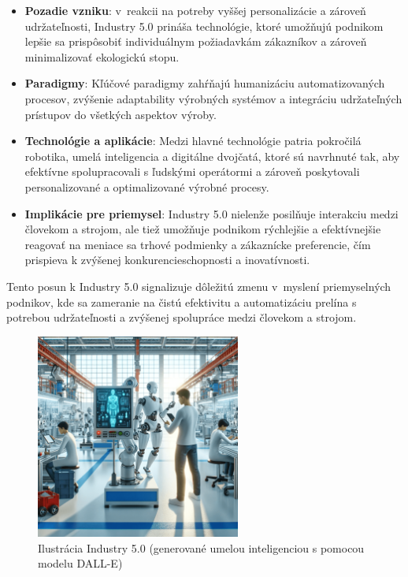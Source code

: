 \begin{itemize}
\item \textbf{Pozadie vzniku}: v~reakcii na potreby vyššej personalizácie a zároveň udržateľnosti, Industry 5.0 prináša technológie, ktoré umožňujú podnikom lepšie sa prispôsobiť individuálnym požiadavkám zákazníkov a zároveň minimalizovať ekologickú stopu.

\item \textbf{Paradigmy}: Kľúčové paradigmy zahŕňajú humanizáciu automatizovaných procesov, zvýšenie adaptability výrobných systémov a integráciu udržateľných prístupov do všetkých aspektov výroby.

\item \textbf{Technológie a aplikácie}: Medzi hlavné technológie patria pokročilá robotika, umelá inteligencia a digitálne dvojčatá, ktoré sú navrhnuté tak, aby efektívne spolupracovali s ľudskými operátormi a zároveň poskytovali personalizované a optimalizované výrobné procesy.

\item \textbf{Implikácie pre priemysel}: Industry 5.0 nielenže posilňuje interakciu medzi človekom a strojom, ale tiež umožňuje podnikom rýchlejšie a efektívnejšie reagovať na meniace sa trhové podmienky a zákaznícke preferencie, čím prispieva k zvýšenej konkurencieschopnosti a inovatívnosti.

\end{itemize}

Tento posun k Industry 5.0 signalizuje dôležitú zmenu v~myslení priemyselných podnikov, kde sa zameranie na čistú efektivitu a automatizáciu prelína s potrebou udržateľnosti a zvýšenej spolupráce medzi človekom a strojom.

\begin{figure}[h]
\centering
\includegraphics[width=0.6\textwidth]{img/industry_5.0.png}
\caption{Ilustrácia Industry 5.0 (generované umelou inteligenciou s pomocou modelu DALL-E) \cite{kucera2024industry40}}
\label{fig:unrealengine5}
\end{figure}

